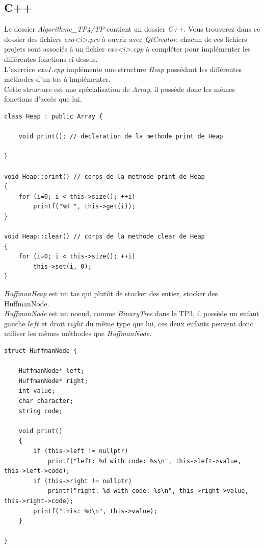 \documentclass[11pt]{extarticle}
\begin{document}
\subsection{C++}
Le dossier \textit{Algorithme\_TP4/TP} contient un dossier \textit{C++}. Vous trouverez dans ce dossier des fichiers \textit{exo<i>.pro} à ouvrir avec \textit{QtCreator}, chacun de ces fichiers projets sont associés à un fichier \textit{exo<i>.cpp} à compléter pour implémenter les différentes fonctions ci-dessus. \\
L'exercice \textit{exo1.cpp} implémente une structure \textit{Heap} possédant les différentes méthodes d'un tas à implémenter. \\
Cette structure est une spécialisation de \textit{Array}, il possède donc les mêmes fonctions d'accès que lui.
\begin{lstlisting}[style=customc, escapechar=@]
class Heap : public Array {

	void print(); // declaration de la methode print de Heap

}

void Heap::print() // corps de la methode print de Heap
{
	for (i=0; i < this->size(); ++i)
		printf("%d ", this->get(i));
}

void Heap::clear() // corps de la methode clear de Heap
{
	for (i=0; i < this->size(); ++i)
		this->set(i, 0);
}
\end{lstlisting}
\textit{HuffmanHeap} est un tas qui plutôt de stocker des entier, stocker des HuffmanNode. \\
\textit{HuffmanNode} est un noeud, comme \textit{BinaryTree} dans le TP3, il possède un enfant gauche $left$ et droit $right$ du même type que lui, ces deux enfants peuvent donc utiliser les mêmes méthodes que \textit{HuffmanNode}. \\
\begin{lstlisting}[style=customc, escapechar=@]
struct HuffmanNode {
	
	HuffmanNode* left;
	HuffmanNode* right;	
	int value;
	char character;
	string code;
	
	void print()
	{
		if (this->left != nullptr)
			printf("left: %d with code: %s\n", this->left->value, this->left->code);
		if (this->right != nullptr)
			printf("right: %d with code: %s\n", this->right->value, this->right->code);
		printf("this: %d\n", this->value);
	}

}
\end{lstlisting}
\end{document}

